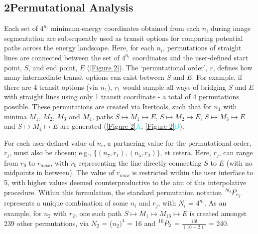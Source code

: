 \documentclass[twocolumn]{biophys-new}
\begin{document}
\subsection*{2\quad Permutational Analysis}

Each set of $4^{n_{i}}$ minimum-energy coordinates obtained from each $n_{i}$ during image segmentation are subsequently used as transit options for comparing potential paths across the energy landscape. Here, for each $n_{i}$, permutations of straight lines are connected between the set of $4^{n_{i}}$ coordinates and the user-defined start point, $S$, and end point, $E$ (\autoref{Figure 2}). The `permutational order', $r$, defines how many intermediate transit options can exist between $S$ and $E$. For example, if there are 4 transit options (via $n_{1}$), $r_1$ would sample all ways of bridging $S$ and $E$ with straight lines using only 1 transit coordinate - a total of 4 permutations possible. These permutations are created via Itertools, such that for $n_{1}$ with minima $M_{1}$, $M_{2}$, $M_{3}$ and $M_{4}$, paths $S\mapsto M_{1}\mapsto E$, $S\mapsto M_{2}\mapsto E$, $S\mapsto M_{3}\mapsto E$ and $S\mapsto M_{4}\mapsto E$ are generated (\autoref{Figure 2}\textcolor{cyan}{A}, \autoref{Figure 2}\textcolor{cyan}{B}). 

For each user-defined value of $n_{i}$, a partnering value for the permutational order, $r_{j}$, must also be chosen; e.g., $\{(n_7, r_1), (n_5, r_2)\}$, et cetera. Here, $r_{j}$, can range from $r_{0}$ to $r_{max}$, with $r_0$ representing the line directly connecting $S$ to $E$ (with no midpoints in between). The value of $r_{max}$ is restricted within the user interface to 5, with higher values deemed counterproductive to the aim of this interpolative procedure. Within this formulation, the standard permutation notation $\tensor*[^{N_{i}}_{}]{P}{^{}_{r_{j}}}$ represents a unique combination of some $n_{i}$ and $r_{j}$, with $N_{i}$ = $4^{n_{i}}$. As an example, for $n_{2}$ with $r_{2}$, one such path $S\mapsto M_{1}\mapsto M_{16}\mapsto E$ is created amongst 239 other permutations, via $N_{2}$ = (${n_{2}})^{4}$ = 16 and $\prescript{16}{}{P_{2}}$ = $\frac{16!}{(16-2)!}$ = 240. 
\end{document}
